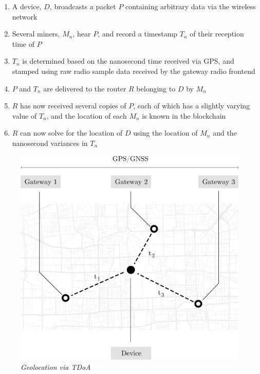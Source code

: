 \documentclass[10pt, nonatbib, nocopyrightspace, reprint]{sigplanconf}
\begin{document}
\begin{enumerate}
        \item A device, $D$, broadcasts a packet $P$ containing arbitrary data via the wireless network
        \item Several miners, $M_n$, hear $P$, and record a timestamp $T_n$ of their reception time of $P$
        \item $T_n$ is determined based on the nanosecond time received via GPS, and stamped using raw radio sample data received by the gateway radio frontend
        \item $P$ and $T_n$ are delivered to the router $R$ belonging to $D$ by $M_n$
        \item $R$ has now received several copies of $P$, each of which has a slightly varying value of $T_n$, and the location of each $M_n$ is known in the blockchain
        \item $R$ can now solve for the location of $D$ using the location of $M_n$ and the nanosecond variances in $T_n$
\end{enumerate}

\begin{figure}[H]
    \begin{center}
          \includegraphics[width=\columnwidth]{tdoa.eps}
          \caption{\emph{Geolocation via TDoA}}
          \label{fig:tdoa}
     \end{center}
\end{figure}
\end{document}
